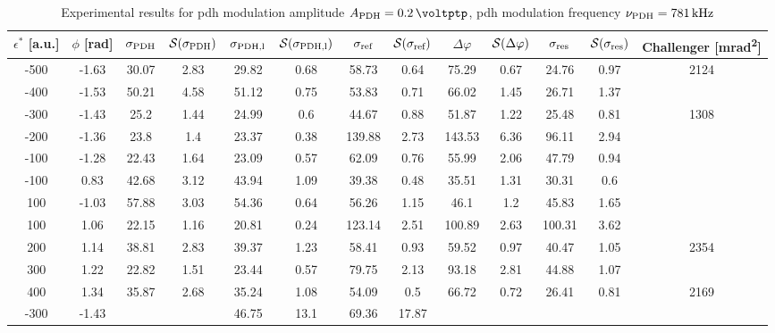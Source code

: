 \begin{landscape}
	\begin{table}
	\centering
	\begin{tabular}{|c|c|c|c|c|c|c|c|c|c|c|c|c|}
		\hline
		$\epsilon^*$ [a.u.] & $\phi$ [\si{\radian}] & $\sigma_{\text{PDH}}$ & $\mathcal{S}(\sigma_{\text{PDH}})$ & $\sigma_{\text{PDH,l}}$ & $\mathcal{S}(\sigma_{\text{PDH,l}})$  & $\sigma_{\text{ref}}$ & $\mathcal{S}(\sigma_{\text{ref}})$ & $\Delta \varphi$ & $\mathcal{S}(\Delta \varphi)$ & $\sigma_{\text{res}}$  & $\mathcal{S}(\sigma_{\text{res}})$ & Challenger [\si{\milli\radian\squared}] \\
		\hline
		\hline
		-500 & -1.63 & 30.07 & 2.83 & 29.82 & 0.68 & 58.73 & 0.64 & 75.29 & 0.67 & 24.76 & 0.97 & 2124\\
		-400 & -1.53 & 50.21 & 4.58 & 51.12 & 0.75 & 53.83 & 0.71 & 66.02 & 1.45 & 26.71 & 1.37 & \\
		-300 & -1.43 & 25.2 & 1.44 & 24.99 & 0.6 & 44.67 & 0.88 & 51.87 & 1.22 & 25.48 & 0.81 & 1308\\
		-200 & -1.36 & 23.8 & 1.4 & 23.37 & 0.38 & 139.88 & 2.73 & 143.53 & 6.36 & 96.11 & 2.94 & \\
		-100 & -1.28 & 22.43 & 1.64 & 23.09 & 0.57 & 62.09 & 0.76 & 55.99 & 2.06 & 47.79 & 0.94 & \\
		-100 & 0.83 & 42.68 & 3.12 & 43.94 & 1.09 & 39.38 & 0.48 & 35.51 & 1.31 & 30.31 & 0.6 & \\
		100 & -1.03 & 57.88 & 3.03 & 54.36 & 0.64 & 56.26 & 1.15 & 46.1 & 1.2 & 45.83 & 1.65 & \\
		100 & 1.06 & 22.15 & 1.16 & 20.81 & 0.24 & 123.14 & 2.51 & 100.89 & 2.63 & 100.31 & 3.62 & \\
		200 & 1.14 & 38.81 & 2.83 & 39.37 & 1.23 & 58.41 & 0.93 & 59.52 & 0.97 & 40.47 & 1.05 & 2354\\
		300 & 1.22 & 22.82 & 1.51 & 23.44 & 0.57 & 79.75 & 2.13 & 93.18 & 2.81 & 44.88 & 1.07 & \\
		400 & 1.34 & 35.87 & 2.68 & 35.24 & 1.08 & 54.09 & 0.5 & 66.72 & 0.72 & 26.41 & 0.81 & 2169\\
		\hline
		\hline
		-300 & -1.43 & & & 46.75 & 13.1 & 69.36 & 17.87 & & & & & \\
		\hline
	\end{tabular}
	\caption{Experimental results for \gls{pdh} modulation amplitude $\tind{A}{PDH} = \SI{0.2}{\voltptp}$, \gls{pdh} modulation frequency $\nu_{\text{PDH}} = \SI{781}{\kilo\hertz}$}
	\end{table}
	
	

\end{landscape}
